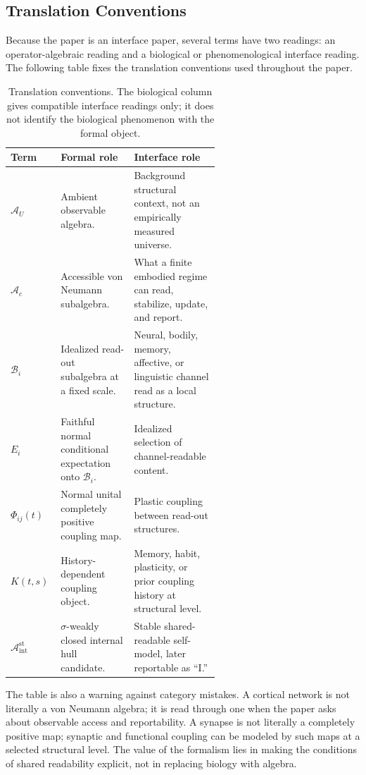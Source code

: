 \documentclass[12pt]{article}
\theoremstyle{definition}
\theoremstyle{remark}
\newcommand{\AU}{\mathcal A_U}
\newcommand{\Ac}{\mathcal A_c}
\newcommand{\Bint}{\mathcal A_{\mathrm{int}}^{\mathrm{st}}}
\begin{document}
\subsection{Translation Conventions}

Because the paper is an interface paper, several terms have two
readings: an operator-algebraic reading and a biological or
phenomenological interface reading. The following table fixes the
translation conventions used throughout the paper.

\begin{table}[H]
\centering
\small
\begin{tabularx}{0.98\linewidth}{P{0.24\linewidth}P{0.35\linewidth}Y}
\toprule
\textbf{Term} & \textbf{Formal role} & \textbf{Interface role} \\
\midrule
\(\AU\) &
Ambient observable algebra. &
Background structural context, not an empirically measured universe. \\
\(\Ac\) &
Accessible von Neumann subalgebra. &
What a finite embodied regime can read, stabilize, update, and report. \\
\(\mathcal B_i\) &
Idealized read-out subalgebra at a fixed scale. &
Neural, bodily, memory, affective, or linguistic channel read as a local structure. \\
\(E_i\) &
Faithful normal conditional expectation onto \(\mathcal B_i\). &
Idealized selection of channel-readable content. \\
\(\Phi_{ij}(t)\) &
Normal unital completely positive coupling map. &
Plastic coupling between read-out structures. \\
\(K(t,s)\) &
History-dependent coupling object. &
Memory, habit, plasticity, or prior coupling history at structural level. \\
\(\Bint\) &
\(\sigma\)-weakly closed internal hull candidate. &
Stable shared-readable self-model, later reportable as ``I.'' \\
\bottomrule
\end{tabularx}
\caption{Translation conventions. The biological column gives
compatible interface readings only; it does not identify the biological
phenomenon with the formal object.}
\end{table}

The table is also a warning against category mistakes. A cortical
network is not literally a von Neumann algebra; it is read through one
when the paper asks about observable access and reportability. A
synapse is not literally a completely positive map; synaptic and
functional coupling can be modeled by such maps at a selected structural
level. The value of the formalism lies in making the conditions of
shared readability explicit, not in replacing biology with algebra.
\end{document}
